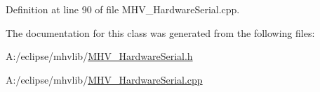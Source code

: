 \-Definition at line 90 of file \-M\-H\-V\-\_\-\-Hardware\-Serial.\-cpp.



\-The documentation for this class was generated from the following files\-:\begin{DoxyCompactItemize}
\item 
\-A\-:/eclipse/mhvlib/\hyperlink{_m_h_v___hardware_serial_8h}{\-M\-H\-V\-\_\-\-Hardware\-Serial.\-h}\item 
\-A\-:/eclipse/mhvlib/\hyperlink{_m_h_v___hardware_serial_8cpp}{\-M\-H\-V\-\_\-\-Hardware\-Serial.\-cpp}\end{DoxyCompactItemize}
